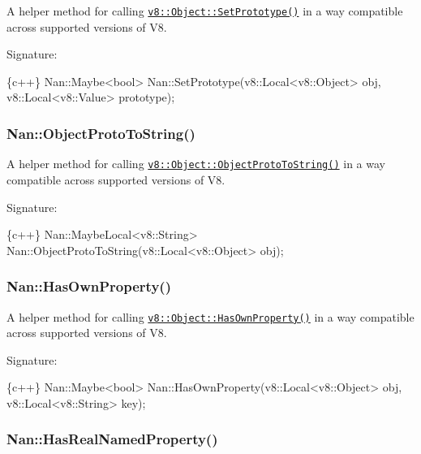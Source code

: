 A helper method for calling \href{https://v8docs.nodesource.com/io.js-3.0/db/d85/classv8_1_1_object.html#a442706b22fceda6e6d1f632122a9a9f4}{\tt {\ttfamily v8\+::\+Object\+::\+Set\+Prototype()}} in a way compatible across supported versions of V8.

Signature\+:


\begin{DoxyCode}
\{c++\}
Nan::Maybe<bool> Nan::SetPrototype(v8::Local<v8::Object> obj,
                                   v8::Local<v8::Value> prototype);
\end{DoxyCode}


\label{_api_nan_object_proto_to_string}%
 \subsubsection*{Nan\+::\+Object\+Proto\+To\+String()}

A helper method for calling \href{https://v8docs.nodesource.com/io.js-3.0/db/d85/classv8_1_1_object.html#ab7a92b4dcf822bef72f6c0ac6fea1f0b}{\tt {\ttfamily v8\+::\+Object\+::\+Object\+Proto\+To\+String()}} in a way compatible across supported versions of V8.

Signature\+:


\begin{DoxyCode}
\{c++\}
Nan::MaybeLocal<v8::String> Nan::ObjectProtoToString(v8::Local<v8::Object> obj);
\end{DoxyCode}


\label{_api_nan_has_own_property}%
 \subsubsection*{Nan\+::\+Has\+Own\+Property()}

A helper method for calling \href{https://v8docs.nodesource.com/io.js-3.0/db/d85/classv8_1_1_object.html#ab7b7245442ca6de1e1c145ea3fd653ff}{\tt {\ttfamily v8\+::\+Object\+::\+Has\+Own\+Property()}} in a way compatible across supported versions of V8.

Signature\+:


\begin{DoxyCode}
\{c++\}
Nan::Maybe<bool> Nan::HasOwnProperty(v8::Local<v8::Object> obj,
                                     v8::Local<v8::String> key);
\end{DoxyCode}


\label{_api_nan_has_real_named_property}%
 \subsubsection*{Nan\+::\+Has\+Real\+Named\+Property()}

